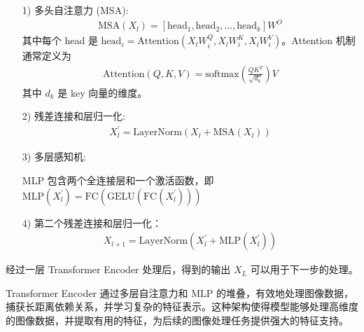 \documentclass[a4paper, 10pt]{article}
\begin{document}
		\begin{itemize}
			\item[1)] 
			多头自注意力 (MSA):
			\begin{equation}
				\begin{aligned}
					\text{MSA}(X_l) = [\text{head}_1, \text{head}_2, \ldots, \text{head}_k] W^{O}
				\end{aligned}
				\label{eq: MSA}
			\end{equation}
			其中每个 head 是 $\text{head}_i = \text{Attention}\left(X_l W_i^Q, X_l W_i^K, X_l W_i^V \right)$。Attention 机制通常定义为
			\begin{equation}
				\begin{aligned}
					\text{Attention}(Q, K, V) = \text{softmax} \left(\frac{QK^T}{\sqrt{d_k}} \right) V
				\end{aligned}
				\label{eq: Attention}
			\end{equation}
			其中 $d_k$ 是 key 向量的维度。
				
			\item[2)]
			残差连接和层归一化:
			\begin{equation}
				\begin{aligned}
					X_l^\prime = \text{LayerNorm} \left(X_l + \text{MSA}(X_l)\right)
				\end{aligned}
				\label{eq: MSA}
			\end{equation}
			\item[3)]
			多层感知机:
			
			MLP 包含两个全连接层和一个激活函数，即 $\text{MLP} (X_l^\prime) = \text{FC}\left(\text{GELU}\left(\text{FC}(X_l^\prime)\right)\right)$
			
			\item[4)]
			第二个残差连接和层归一化：
			\begin{equation}
				\begin{aligned}
					X_{l+1} = \text{LayerNorm} (X_l^\prime + \text{MLP}(X_l^\prime))
				\end{aligned}
				\label{eq: layernorm}
			\end{equation}
		\end{itemize}
		
		经过一层 Transformer Encoder 处理后，得到的输出 $X_L$ 可以用于下一步的处理。
		
		Transformer Encoder 通过多层自注意力和 MLP 的堆叠，有效地处理图像数据，捕获长距离依赖关系，并学习复杂的特征表示。这种架构使得模型能够处理高维度的图像数据，并提取有用的特征，为后续的图像处理任务提供强大的特征支持。
		
\end{document}
